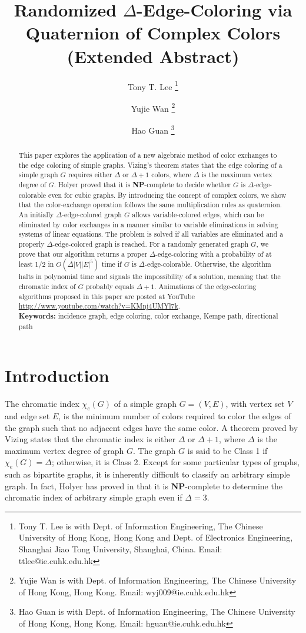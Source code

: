 \documentclass[11pt]{article}
\title{Randomized $\Delta$-Edge-Coloring via Quaternion of Complex Colors\\ (Extended Abstract)}
\author{
	Tony T. Lee \footnote{Tony T. Lee is with Dept. of Information Engineering, The Chinese University of Hong Kong, Hong Kong and Dept. of Electronics Engineering, Shanghai Jiao Tong University, Shanghai, China. Email: ttlee@ie.cuhk.edu.hk }
	\and
	 Yujie Wan \footnote{Yujie Wan is with Dept. of Information Engineering, The Chinese University of Hong Kong, Hong Kong. Email: wyj009@ie.cuhk.edu.hk}
	\and 
	Hao Guan  \footnote{Hao Guan is with Dept. of Information Engineering, The Chinese University of Hong Kong, Hong Kong. Email: hguan@ie.cuhk.edu.hk}
}
\begin{document}
\maketitle 

\begin{abstract}
	This paper explores the application of a new algebraic method of color exchanges to the edge coloring of simple graphs. Vizing's theorem states that the edge coloring of a simple graph $G$ requires either $\Delta$ or $\Delta+1$ colors, where $\Delta$ is the maximum vertex degree of $G$. Holyer proved that it is {\bf NP}-complete to decide whether $G$ is $\Delta$-edge-colorable even for cubic graphs. By introducing the concept of complex colors, we show that the color-exchange operation follows the same multiplication rules as quaternion. An initially $\Delta$-edge-colored graph $G$ allows variable-colored edges, which can be eliminated by color exchanges in a manner similar to variable eliminations in solving systems of linear equations. The problem is solved if all variables are eliminated and a properly $\Delta$-edge-colored graph is reached. For a randomly generated graph $G$, we prove that our algorithm returns a proper $\Delta$-edge-coloring with a probability of at least 1/2 in $O(\Delta|V||E|^5 )$ time if $G$ is $\Delta$-edge-colorable. Otherwise, the algorithm halts in polynomial time and signals the impossibility of a solution, meaning that the chromatic index of $G$ probably equals $\Delta+1$. Animations of the edge-coloring algorithms proposed in this paper are posted at YouTube \url{http://www.youtube.com/watch?v=KMnj4UMYl7k}.\\
\textbf{Keywords:} incidence graph, edge coloring, color exchange, Kempe path, directional path
\end{abstract}



\section{Introduction}


The chromatic index $\chi_e (G)$  of a simple graph $G=(V,E)$, with vertex set $V$ and edge set $E$, is the minimum number of colors required to color the edges of the graph such that no adjacent edges have the same color. A theorem proved by Vizing \cite{west2001introduction} states that the chromatic index is either $\Delta$ or $\Delta+1$, where $\Delta$ is the maximum vertex degree of graph $G$. The graph $G$ is said to be Class 1 if $\chi_e(G)=\Delta$; otherwise, it is Class 2. Except for some particular types of graphs, such as bipartite graphs, it is inherently difficult to classify an arbitrary simple graph. In fact, Holyer has proved in \cite{holyer1981np} that it is {\bf NP}-complete to determine the chromatic index of arbitrary simple graph even if $\Delta=3$. 
\end{document}
